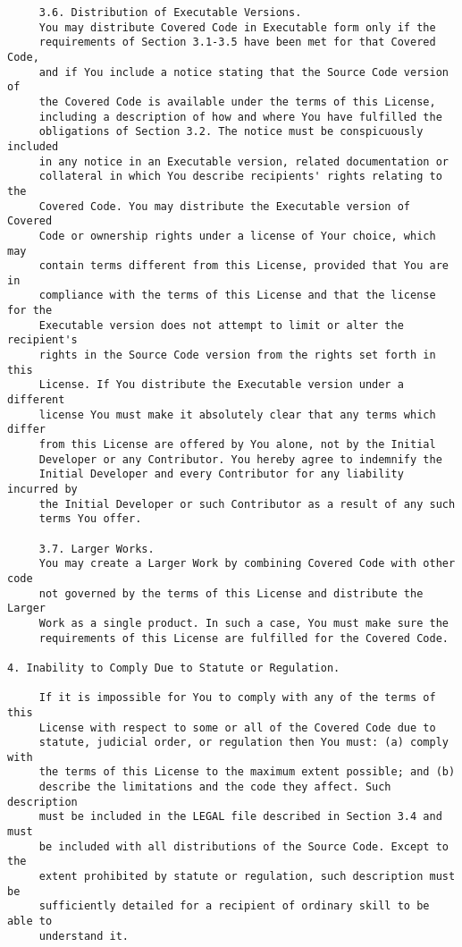 \begin{verbatim}
     3.6. Distribution of Executable Versions.
     You may distribute Covered Code in Executable form only if the
     requirements of Section 3.1-3.5 have been met for that Covered Code,
     and if You include a notice stating that the Source Code version of
     the Covered Code is available under the terms of this License,
     including a description of how and where You have fulfilled the
     obligations of Section 3.2. The notice must be conspicuously included
     in any notice in an Executable version, related documentation or
     collateral in which You describe recipients' rights relating to the
     Covered Code. You may distribute the Executable version of Covered
     Code or ownership rights under a license of Your choice, which may
     contain terms different from this License, provided that You are in
     compliance with the terms of this License and that the license for the
     Executable version does not attempt to limit or alter the recipient's
     rights in the Source Code version from the rights set forth in this
     License. If You distribute the Executable version under a different
     license You must make it absolutely clear that any terms which differ
     from this License are offered by You alone, not by the Initial
     Developer or any Contributor. You hereby agree to indemnify the
     Initial Developer and every Contributor for any liability incurred by
     the Initial Developer or such Contributor as a result of any such
     terms You offer.

     3.7. Larger Works.
     You may create a Larger Work by combining Covered Code with other code
     not governed by the terms of this License and distribute the Larger
     Work as a single product. In such a case, You must make sure the
     requirements of this License are fulfilled for the Covered Code.

4. Inability to Comply Due to Statute or Regulation.

     If it is impossible for You to comply with any of the terms of this
     License with respect to some or all of the Covered Code due to
     statute, judicial order, or regulation then You must: (a) comply with
     the terms of this License to the maximum extent possible; and (b)
     describe the limitations and the code they affect. Such description
     must be included in the LEGAL file described in Section 3.4 and must
     be included with all distributions of the Source Code. Except to the
     extent prohibited by statute or regulation, such description must be
     sufficiently detailed for a recipient of ordinary skill to be able to
     understand it.


\end{verbatim}
